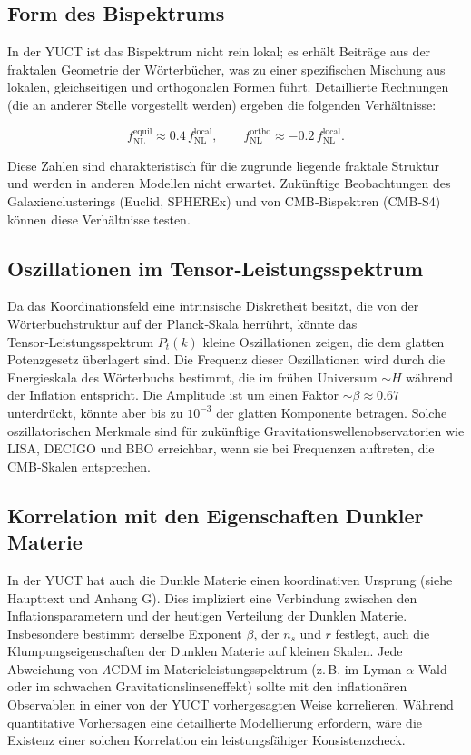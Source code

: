 \documentclass[11pt,a4paper]{article}
\begin{document}
	\subsection{Form des Bispektrums}
	
	In der YUCT ist das Bispektrum nicht rein lokal; es erhält Beiträge aus der fraktalen Geometrie der Wörterbücher, was zu einer spezifischen Mischung aus lokalen, gleichseitigen und orthogonalen Formen führt. Detaillierte Rechnungen (die an anderer Stelle vorgestellt werden) ergeben die folgenden Verhältnisse:
	
	\begin{equation}
		f_{\text{NL}}^{\text{equil}} \approx 0.4\, f_{\text{NL}}^{\text{local}}, \qquad
		f_{\text{NL}}^{\text{ortho}} \approx -0.2\, f_{\text{NL}}^{\text{local}}.
		\label{eq:fnl-shapes}
	\end{equation}
	
	Diese Zahlen sind charakteristisch für die zugrunde liegende fraktale Struktur und werden in anderen Modellen nicht erwartet. Zukünftige Beobachtungen des Galaxienclusterings (Euclid, SPHEREx) und von CMB‑Bispektren (CMB‑S4) können diese Verhältnisse testen.
	
	\subsection{Oszillationen im Tensor‑Leistungsspektrum}
	
	Da das Koordinationsfeld eine intrinsische Diskretheit besitzt, die von der Wörterbuchstruktur auf der Planck‑Skala herrührt, könnte das Tensor‑Leistungsspektrum \(P_t(k)\) kleine Oszillationen zeigen, die dem glatten Potenzgesetz überlagert sind. Die Frequenz dieser Oszillationen wird durch die Energieskala des Wörterbuchs bestimmt, die im frühen Universum \(\sim H\) während der Inflation entspricht. Die Amplitude ist um einen Faktor \(\sim \beta \approx 0.67\) unterdrückt, könnte aber bis zu \(10^{-3}\) der glatten Komponente betragen. Solche oszillatorischen Merkmale sind für zukünftige Gravitationswellenobservatorien wie LISA, DECIGO und BBO erreichbar, wenn sie bei Frequenzen auftreten, die CMB‑Skalen entsprechen.
	
	\subsection{Korrelation mit den Eigenschaften Dunkler Materie}
	
	In der YUCT hat auch die Dunkle Materie einen koordinativen Ursprung (siehe Haupttext und Anhang G). Dies impliziert eine Verbindung zwischen den Inflationsparametern und der heutigen Verteilung der Dunklen Materie. Insbesondere bestimmt derselbe Exponent \(\beta\), der \(n_s\) und \(r\) festlegt, auch die Klumpungseigenschaften der Dunklen Materie auf kleinen Skalen. Jede Abweichung von \(\Lambda\)CDM im Materieleistungsspektrum (z. B. im Lyman‑\(\alpha\)‑Wald oder im schwachen Gravitationslinseneffekt) sollte mit den inflationären Observablen in einer von der YUCT vorhergesagten Weise korrelieren. Während quantitative Vorhersagen eine detaillierte Modellierung erfordern, wäre die Existenz einer solchen Korrelation ein leistungsfähiger Konsistenzcheck.
	
\end{document}
